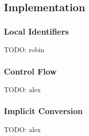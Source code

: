 \subsection{Implementation}


\subsubsection{Local Identifiers}
TODO: robin

\subsubsection{Control Flow}
TODO: alex

\subsubsection{Implicit Conversion}
TODO: alex

